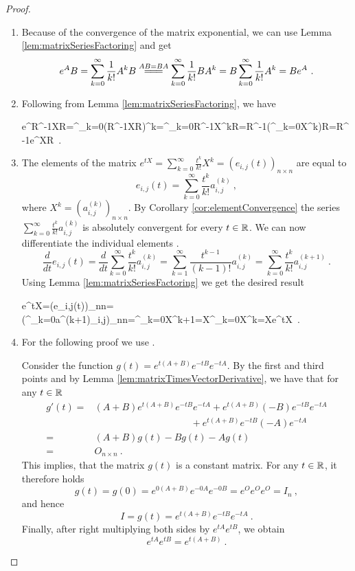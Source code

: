 \begin{proof}
	\begin{enumerate}
		\item
		Because of the convergence of the matrix exponential, we can use Lemma \ref{lem:matrixSeriesFactoring} and get
		$$e^{A}B=\sum^\infty_{k=0}\frac{1}{k!}A^{k}B\stackrel{AB=BA}{=\joinrel=\joinrel=}\sum^\infty_{k=0}\frac{1}{k!}BA^{k}=B\sum^\infty_{k=0}\frac{1}{k!}A^{k}=Be^{A}\ .$$
		
		\item Following from Lemma \ref{lem:matrixSeriesFactoring}, we have 
		\begin{longeq}
			e^{R^{-1}XR}=\sum^\infty_{k=0}(R^{-1}XR)^{k}=\sum^\infty_{k=0}R^{-1}X^{k}R=R^{-1}\left(\sum^\infty_{k=0}X^{k}\right)R=R^{-1}e^{X}R\ . 
		\end{longeq}

		\item The elements of the matrix $e^{tX}=\sum^\infty_{k=0}\frac{t^k}{k!}X^{k}=(e_{i,j}(t))_{n\times n}$ are equal to
		$$e_{i,j}(t)=\sum^\infty_{k=0}\frac{t^k}{k!}a^{(k)}_{i,j}\ ,$$
		where $X^k=(a^{(k)}_{i,j})_{n\times n}$. By Corollary \ref{cor:elementConvergence} the series $\sum^\infty_{k=0}\frac{t^k}{k!}a^{(k)}_{i,j}$ is absolutely convergent for every $t\in\mathbb{R}$. We can now differentiate the individual elements \citep[see][Věta 8.2.2]{Pick}.
		$$\frac{d}{dt}e_{i,j}(t)=\frac{d}{dt}\sum^\infty_{k=0}\frac{t^k}{k!}a^{(k)}_{i,j}=\sum^\infty_{k=1}\frac{t^{k-1}}{(k-1)!}a^{(k)}_{i,j}=\sum^\infty_{k=0}\frac{t^{k}}{k!}a^{(k+1)}_{i,j}\ .$$ 
		Using Lemma \ref{lem:matrixSeriesFactoring} we get the desired result
		\begin{longeq}
			e^{tX}=\left(e_{i,j}(t)\right)_{n\times n}=\left(\sum^\infty_{k=0}a^{(k+1)}_{i,j}\right)_{n\times n}=\sum^\infty_{k=0}X^{k+1}=X\sum^\infty_{k=0}X^{k}=Xe^{tX}\ .
		\end{longeq}

		\item For the following proof we use \citet[Theorem 5]{Klain}.
		
		Consider the function $g(t)=e^{t(A+B)}e^{-tB}e^{-tA}$. By the first and third points and by Lemma \ref{lem:matrixTimesVectorDerivative}, we have that for any $t\in\mathbb{R}$ 
		\begin{align*}
			g'(t)
			=&(A+B)e^{t(A+B)}e^{-tB}e^{-tA}+e^{t(A+B)}(-B)e^{-tB}e^{-tA}
			\\
			&\qquad\qquad\qquad\qquad\quad\quad +e^{t(A+B)}e^{-tB}(-A)e^{-tA}
			\\
			=&(A+B)g(t)-Bg(t)-Ag(t)
			\\
			=&O_{n\times n}\ .
		\end{align*}
		This implies, that the matrix $g(t)$ is a constant matrix. For any $t\in\mathbb{R}$, it therefore holds
		$$g(t)=g(0)=e^{0(A+B)}e^{-0A}e^{-0B}=e^Oe^Oe^O=I_n\ ,$$
		and hence
		$$I=g(t)=e^{t(A+B)}e^{-tB}e^{-tA}\ .$$
		Finally, after right multiplying both sides by $e^{tA}e^{tB}$, we obtain
		$$e^{tA}e^{tB}=e^{t(A+B)}\ .$$
	\end{enumerate}
\end{proof}


